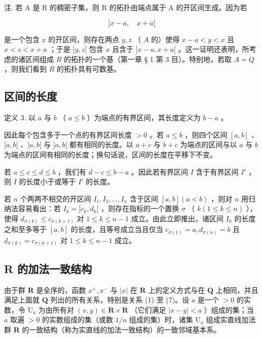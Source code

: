 注. 若 A 是 R 的稠密子集，则 R 的拓扑由端点属于 A 的开区间生成。因为若

\[
] x - a, \quad x + a [
\]

是一个包含 \(x\) 的开区间，则存在两点 \(y, z\) （ \(A\) 的）使得 \(x - a < y < x\) 且 \(x < z < x + a\) ；于是 \(]y, z[\) 包含 \(x\) 且含于 \(]x - a, x + a[\) 。这一证明还表明，所考虑的诸区间组成 \(R\) 的拓扑的一个基（第一章 § 1 第 3 目）。特别地，若取 \(A = Q\) ，则我们看到 \(R\) 的拓扑具有可数基。

\subsection{区间的长度}

定义 3. 以 \(a\) 与 \(b\) （ \(a \leqslant b\) ）为端点的有界区间，其长度定义为 \(b - a\) 。

因此每个包含多于一个点的有界区间长度 \(> 0\) 。若 \(a \leqslant b\) ，则四个区间 \([a, b]\) 、\(]a, b[\) 、\([a, b[\) 与 \(]a, b[\) 都有相同的长度。以 \(a + c\) 与 \(b + c\) 为端点的区间与以 \(a\) 与 \(b\) 为端点的区间有相同的长度；换句话说，区间的长度在平移下不变。

若 \(a \leqslant c \leqslant d \leqslant b\) ，我们有 \(d - c \leqslant b - a\) 。因此若有界区间 \(I\) 含于有界区间 \(I'\) ，则 \(I\) 的长度小于或等于 \(I'\) 的长度。

若 \(n\) 个两两不相交的开区间 \(I_1, I_2, \ldots, I_n\) 含于区间 \([a, b] (a < b)\) ，则对 \(n\) 用归纳法容易看出：若 \(I_k = ]c_k, d_k[\) ，则存在指标的一个置换 \(\sigma\) （ \(k (1 \leqslant k \leqslant n)\) ），使得 \(d_{\sigma(k)} \leqslant c_{\sigma(k+1)}\) 对 \(1 \leqslant k \leqslant n - 1\) 成立。由此立即推出，诸区间 \(I_k\) 的长度之和至多等于 \([a, b]\) 的长度，且等号成立当且仅当 \(c_{\sigma(1)} = a, d_{\sigma(n)} = b\) 且 \(d_{\sigma(k)} = c_{\sigma(k+1)}\) 对 \(1 \leqslant k \leqslant n - 1\) 成立。

\subsection{R 的加法一致结构}

由于群 \(\mathbf{R}\) 是全序的，函数 \(x^{+}, x^{-}\) 与 \(|x|\) 在 \(\mathbf{R}\) 上的定义方式与在 \(\mathbf{Q}\) 上相同，并且满足上面就 \(\mathbf{Q}\) 列出的所有关系，特别是关系 (1) 至 (7)。设 \(a\) 是一个 \(>0\) 的实数，令 \(\mathrm{U}_{a}\) 为由所有对 \((x, y) \in \mathbf{R} \times \mathbf{R}\) （它们满足 \(|x - y| < a\) ）组成的集；当 \(a\) 取遍 \(>0\) 的实数组成的集（或数 \(1/n\) 组成的集）时，诸集 \(\mathrm{U}_{a}\) 组成实直线加法群 \(\mathbf{R}\) 的一致结构（称为实直线的加法一致结构）的一致邻域基本系。

